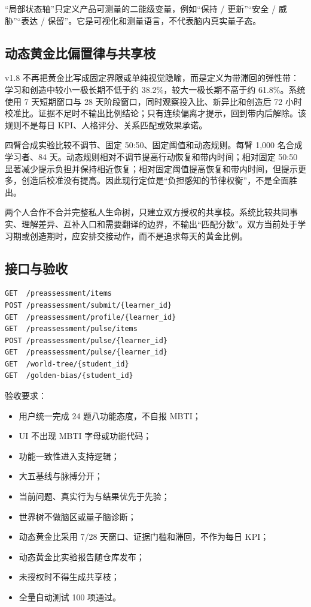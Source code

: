 \documentclass[UTF8,a4paper,11pt]{ctexart}
\begin{document}
“局部状态轴”只定义产品可测量的二能级变量，例如“保持 / 更新”“安全 / 威胁”“表达 / 保留”。它是可视化和测量语言，不代表脑内真实量子态。

\subsection{动态黄金比偏置律与共享枝}

v1.8 不再把黄金比写成固定界限或单纯视觉隐喻，而是定义为带滞回的弹性带：学习和创造中较小一极长期不低于约 38.2\%，较大一极长期不高于约 61.8\%。系统使用 7 天短期窗口与 28 天阶段窗口，同时观察投入比、新异比和创造后 72 小时校准比。证据不足时不输出比例结论；只有连续偏离才提示，回到带内后解除。该规则不是每日 KPI、人格评分、关系匹配或效果承诺。

四臂合成实验比较不调节、固定 50:50、固定阈值和动态规则。每臂 1,000 名合成学习者、84 天。动态规则相对不调节提高行动恢复和带内时间；相对固定 50:50 显著减少提示负担并保持相近恢复；相对固定阈值提高恢复和带内时间，但提示更多，创造后校准没有提高。因此现行定位是“负担感知的节律权衡”，不是全面胜出。

两个人合作不合并完整私人生命树，只建立双方授权的共享枝。系统比较共同事实、理解差异、互补入口和需要翻译的边界，不输出“匹配分数”。双方当前处于学习期或创造期时，应安排交接动作，而不是追求每天的黄金比例。

\subsection{接口与验收}

\begin{verbatim}
GET  /preassessment/items
POST /preassessment/submit/{learner_id}
GET  /preassessment/profile/{learner_id}
GET  /preassessment/pulse/items
POST /preassessment/pulse/{learner_id}
GET  /preassessment/pulse/{learner_id}
GET  /world-tree/{student_id}
GET  /golden-bias/{student_id}
\end{verbatim}

验收要求：

\begin{itemize}
\item 用户统一完成 24 题八功能态度，不自报 MBTI；
\item UI 不出现 MBTI 字母或功能代码；
\item 功能一致性进入支持逻辑；
\item 大五基线与脉搏分开；
\item 当前问题、真实行为与结果优先于先验；
\item 世界树不做脑区或量子脑诊断；
\item 动态黄金比采用 7/28 天窗口、证据门槛和滞回，不作为每日 KPI；
\item 动态黄金比实验报告随仓库发布；
\item 未授权时不得生成共享枝；
\item 全量自动测试 100 项通过。
\end{itemize}
\end{document}
